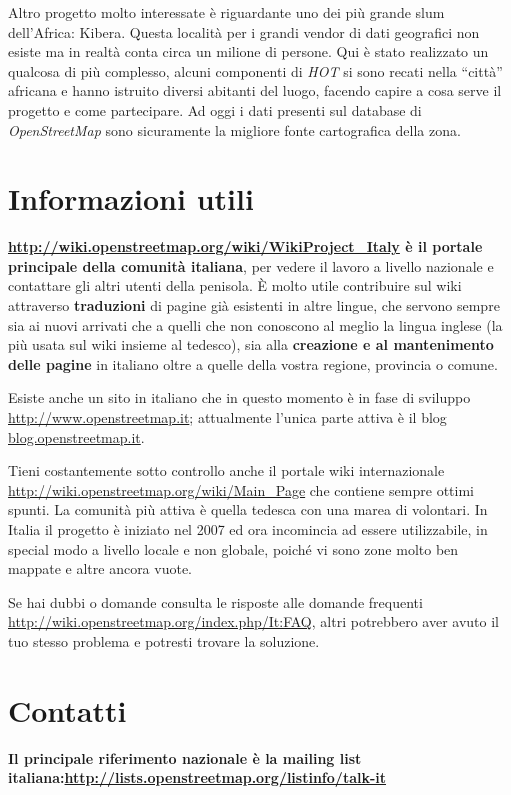 \documentclass[a4paper,twoside,12pt,]{article}
\newcommand{\osm}{\emph{OpenStreetMap}\xspace}
\newcommand{\pro}[1]{\emph{#1}}
\begin{document}
Altro progetto molto interessate è riguardante uno dei più grande slum dell'Africa: Kibera.
Questa località per i grandi vendor di dati geografici non esiste ma in realtà conta circa un milione di persone. Qui è stato realizzato un qualcosa di più complesso, alcuni componenti di \pro{HOT} si sono recati nella ``città'' africana e hanno istruito diversi abitanti del luogo, facendo capire a cosa serve il progetto e come partecipare. Ad oggi i dati presenti sul database di \osm sono sicuramente la migliore fonte cartografica della zona.
\section{Informazioni utili}
\textbf{\url{http://wiki.openstreetmap.org/wiki/WikiProject_Italy} è il portale principale della comunità italiana}, per vedere il lavoro a livello nazionale e contattare gli altri utenti della penisola. È molto utile contribuire sul wiki attraverso \textbf{traduzioni} di pagine già esistenti in altre lingue, che servono sempre sia ai nuovi arrivati che a quelli che non conoscono al meglio la lingua inglese (la più usata sul wiki insieme al tedesco), sia alla \textbf{creazione e al mantenimento delle pagine} in italiano oltre a quelle della vostra regione, provincia o comune.

Esiste anche un sito in italiano che in questo momento è in fase di sviluppo \url{http://www.openstreetmap.it}; attualmente l'unica parte attiva è il blog \url{blog.openstreetmap.it}.

Tieni costantemente sotto controllo anche il portale wiki internazionale \url{http://wiki.openstreetmap.org/wiki/Main_Page} che contiene sempre ottimi spunti.  La comunità più attiva è quella tedesca con una marea di volontari. In Italia il progetto è iniziato nel 2007 ed ora incomincia ad essere utilizzabile, in special modo a livello locale e non globale, poiché vi sono zone molto ben mappate e altre ancora vuote.

Se hai dubbi o domande consulta le risposte alle domande frequenti \url{http://wiki.openstreetmap.org/index.php/It:FAQ}, altri potrebbero aver avuto il tuo stesso problema e potresti trovare la soluzione.
\section{Contatti}
\textbf{Il principale riferimento nazionale è la mailing list italiana:\newline \url{http://lists.openstreetmap.org/listinfo/talk-it}}
\end{document}
